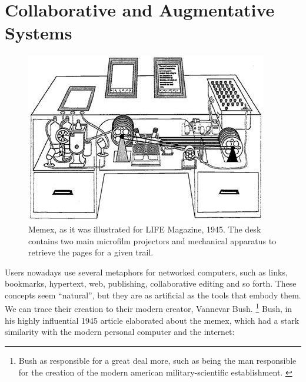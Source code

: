 \section{Collaborative and Augmentative Systems}


\begin{figure}
  \begin{center}
    \includegraphics[scale=0.4]{images/memex.jpg}
  \end{center}
  \caption{ Memex, as it was illustrated for LIFE Magazine, 1945. The
    desk contains two main microfilm projectors and mechanical
    apparatus to retrieve the pages for a given
    trail. \cite{hypertext:muller__vision_and_reality}}
\end{figure}

Users nowadays use several metaphors for networked computers, such as
links, bookmarks, hypertext, web, publishing, collaborative editing
and so forth. These concepts seem ``natural'', but they are as
artificial as the tools that embody them. We can trace their creation
to their modern creator, Vannevar
Bush. \footnote{ Bush as responsible for a great deal more, such as being the man
responsible for the creation of the modern american military-scientific
establishment. \cite{history:pascal__godfather} } Bush, in his highly
influential 1945 article \cite{hypertext:bush__as_we_may_think}
elaborated about the memex, which had a stark similarity with the
modern personal computer and the internet:

